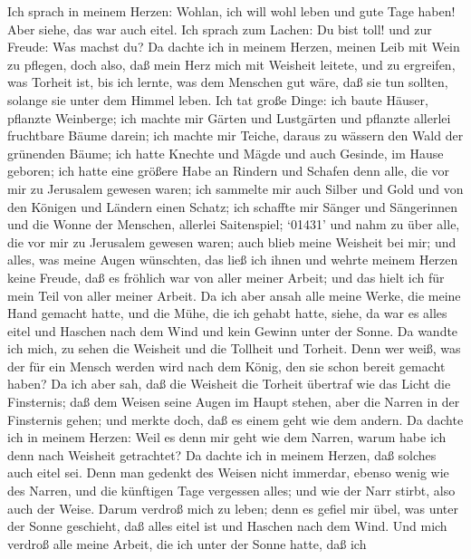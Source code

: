  Ich sprach in meinem Herzen: Wohlan, ich will wohl leben
und gute Tage haben! Aber siehe, das war auch eitel.  Ich
sprach zum Lachen: Du bist toll! und zur Freude: Was machst du?
 Da dachte ich in meinem Herzen, meinen Leib mit Wein zu
pflegen, doch also, daß mein Herz mich mit Weisheit leitete, und zu
ergreifen, was Torheit ist, bis ich lernte, was dem Menschen gut wäre,
daß sie tun sollten, solange sie unter dem Himmel leben. 
Ich tat große Dinge: ich baute Häuser, pflanzte Weinberge; 
ich machte mir Gärten und Lustgärten und pflanzte allerlei fruchtbare
Bäume darein;  ich machte mir Teiche, daraus zu wässern den
Wald der grünenden Bäume;  ich hatte Knechte und Mägde und
auch Gesinde, im Hause geboren; ich hatte eine größere Habe an Rindern
und Schafen denn alle, die vor mir zu Jerusalem gewesen waren;
 ich sammelte mir auch Silber und Gold und von den Königen
und Ländern einen Schatz; ich schaffte mir Sänger und Sängerinnen und
die Wonne der Menschen, allerlei Saitenspiel;  `01431' und
nahm zu über alle, die vor mir zu Jerusalem gewesen waren; auch blieb
meine Weisheit bei mir;  und alles, was meine Augen
wünschten, das ließ ich ihnen und wehrte meinem Herzen keine Freude, daß
es fröhlich war von aller meiner Arbeit; und das hielt ich für mein Teil
von aller meiner Arbeit.  Da ich aber ansah alle meine
Werke, die meine Hand gemacht hatte, und die Mühe, die ich gehabt hatte,
siehe, da war es alles eitel und Haschen nach dem Wind und kein Gewinn
unter der Sonne.  Da wandte ich mich, zu sehen die Weisheit
und die Tollheit und Torheit. Denn wer weiß, was der für ein Mensch
werden wird nach dem König, den sie schon bereit gemacht haben?
 Da ich aber sah, daß die Weisheit die Torheit übertraf wie
das Licht die Finsternis;  daß dem Weisen seine Augen im
Haupt stehen, aber die Narren in der Finsternis gehen; und merkte doch,
daß es einem geht wie dem andern.  Da dachte ich in meinem
Herzen: Weil es denn mir geht wie dem Narren, warum habe ich denn nach
Weisheit getrachtet? Da dachte ich in meinem Herzen, daß solches auch
eitel sei.  Denn man gedenkt des Weisen nicht immerdar,
ebenso wenig wie des Narren, und die künftigen Tage vergessen alles; und
wie der Narr stirbt, also auch der Weise.  Darum verdroß
mich zu leben; denn es gefiel mir übel, was unter der Sonne geschieht,
daß alles eitel ist und Haschen nach dem Wind.  Und mich
verdroß alle meine Arbeit, die ich unter der Sonne hatte, daß ich
